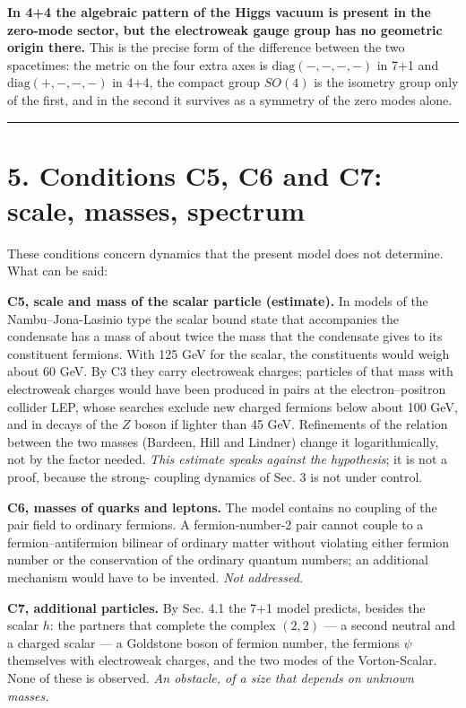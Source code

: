 \documentclass[
  10pt,
]{article}
\begin{document}
\textbf{In 4+4 the algebraic pattern of the Higgs vacuum is present in
the zero-mode sector, but the electroweak gauge group has no geometric
origin there.} This is the precise form of the difference between the
two spacetimes: the metric on the four extra axes is
\(\mathrm{diag}(-,-,-,-)\) in 7+1 and \(\mathrm{diag}(+,-,-,-)\) in 4+4,
the compact group \(SO(4)\) is the isometry group only of the first, and
in the second it survives as a symmetry of the zero modes alone.

\begin{center}\rule{0.5\linewidth}{0.5pt}\end{center}

\hypertarget{conditions-c5-c6-and-c7-scale-masses-spectrum}{%
\section{5. Conditions C5, C6 and C7: scale, masses,
spectrum}\label{conditions-c5-c6-and-c7-scale-masses-spectrum}}

These conditions concern dynamics that the present model does not
determine. What can be said:

\textbf{C5, scale and mass of the scalar particle (estimate).} In models
of the Nambu--Jona-Lasinio type the scalar bound state that accompanies
the condensate has a mass of about twice the mass that the condensate
gives to its constituent fermions. With 125 GeV for the scalar, the
constituents would weigh about 60 GeV. By C3 they carry electroweak
charges; particles of that mass with electroweak charges would have been
produced in pairs at the electron--positron collider LEP, whose searches
exclude new charged fermions below about 100 GeV, and in decays of the
\(Z\) boson if lighter than 45 GeV. Refinements of the relation between
the two masses (Bardeen, Hill and Lindner) change it logarithmically,
not by the factor needed. \emph{This estimate speaks against the
hypothesis}; it is not a proof, because the strong- coupling dynamics of
Sec. 3 is not under control.

\textbf{C6, masses of quarks and leptons.} The model contains no
coupling of the pair field to ordinary fermions. A fermion-number-2 pair
cannot couple to a fermion--antifermion bilinear of ordinary matter
without violating either fermion number or the conservation of the
ordinary quantum numbers; an additional mechanism would have to be
invented. \emph{Not addressed.}

\textbf{C7, additional particles.} By Sec. 4.1 the 7+1 model predicts,
besides the scalar \(h\): the partners that complete the complex
\((2,2)\) --- a second neutral and a charged scalar --- a Goldstone
boson of fermion number, the fermions \(\psi\) themselves with
electroweak charges, and the two modes of the Vorton-Scalar. None of
these is observed. \emph{An obstacle, of a size that depends on unknown
masses.}
\end{document}
